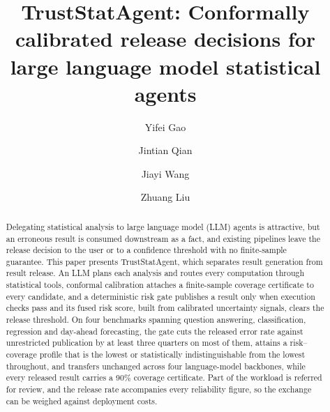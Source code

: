 \documentclass[preprint,12pt,authoryear]{elsarticle}
\begin{document}
\begin{frontmatter}

\title{TrustStatAgent: Conformally calibrated release decisions for large language model statistical agents}

\author[inst1]{Yifei Gao}

\author[inst1]{Jintian Qian}

\author[inst1]{Jiayi Wang}

\author[inst1]{Zhuang Liu}



\begin{abstract}

{\color{blue}
Delegating statistical analysis to large language model (LLM) agents is attractive, but an erroneous result is consumed downstream as a fact, and existing pipelines leave the release decision to the user or to a confidence threshold with no finite-sample guarantee. This paper presents TrustStatAgent, which separates result generation from result release. An LLM plans each analysis and routes every computation through statistical tools, conformal calibration attaches a finite-sample coverage certificate to every candidate, and a deterministic risk gate publishes a result only when execution checks pass and its fused risk score, built from calibrated uncertainty signals, clears the release threshold. On four benchmarks spanning question answering, classification, regression and day-ahead forecasting, the gate cuts the released error rate against unrestricted publication by at least three quarters on most of them, attains a risk--coverage profile that is the lowest or statistically indistinguishable from the lowest throughout, and transfers unchanged across four language-model backbones, while every released result carries a 90\% coverage certificate. Part of the workload is referred for review, and the release rate accompanies every reliability figure, so the exchange can be weighed against deployment costs.
}

\end{abstract}


\end{frontmatter}
\end{document}
